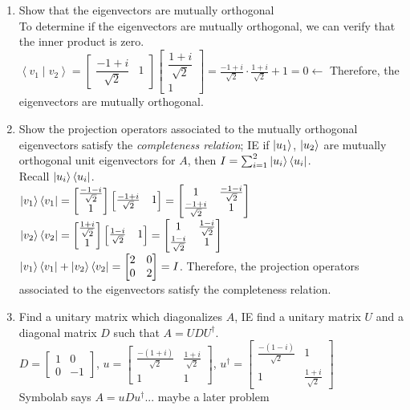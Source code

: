 \documentclass[12pt]{article}
\theoremstyle{plain}
\theoremstyle{nonumberplain}
\theoremstyle{plain}
\theoremstyle{nonumberplain}
\newcommand\1{{\bf 1}}
\newcommand{\bmat}[1]{\begin{bmatrix*} #1 \end{bmatrix*}} %
\newcommand{\<}{\left\langle}
\renewcommand{\>}{\right\rangle}
\newcommand{\inp}[2]{\left\langle#1\mid #2\right\rangle} %
\begin{document}
\begin{enumerate}[label=(\alph*)]
\item Show that the eigenvectors are mutually orthogonal \\
To determine if the eigenvectors are mutually orthogonal, we can verify that the inner product is zero. \\
$\inp{v_1}{v_2}=\bmat{\dfrac{-1+i}{\sqrt{2}} & 1}\bmat{\dfrac{1+i}{\sqrt{2}} \\ 1}=\frac{-1+i}{\sqrt{2}}\cdot\frac{1+i}{\sqrt{2}}+1=0\longleftarrow$ Therefore, the eigenvectors are mutually orthogonal.
\item Show the projection operators associated to the mutually orthogonal eigenvectors satisfy the \textit{completeness relation}; IE if $\ket{u_1}$, $\ket{u_2}$ are mutually orthogonal unit eigenvectors for $A$, then $I=\sum^2_{i=1}\ket{u_i}\bra{u_i}$. \\
Recall $\ket{u_i}\bra{u_i}$. \\
$\ket{v_1}\bra{v_1}=\bmat{\frac{-1-i}{\sqrt{2}} \\ 1}\bmat{\frac{-1+i}{\sqrt{2}} & 1}=\bmat{1 & \frac{-1-i}{\sqrt{2}} \\ \frac{-1+i}{\sqrt{2}} & 1}$ \\
$\ket{v_2}\bra{v_2}=\bmat{\frac{1+i}{\sqrt{2}} \\ 1}\bmat{\frac{1-i}{\sqrt{2}} & 1}=\bmat{1 & \frac{1-i}{\sqrt{2}} \\ \frac{1-i}{\sqrt{2}} & 1}$ \\
$\ket{v_1}\bra{v_1}+\ket{v_2}\bra{v_2}=\bmat{2 & 0 \\ 0 & 2}=I$. Therefore, the projection operators associated to the eigenvectors satisfy the completeness relation.
\item Find a unitary matrix which diagonalizes $A$, IE find a unitary matrix $U$ and a diagonal matrix $D$ such that $A=UDU^\dagger$. \\
$D=\bmat{1 & 0 \\ 0 & -1}$, $u=\bmat{\frac{-(1+i)}{\sqrt{2}} & \frac{1+i}{\sqrt{2}} \\ 1 & 1}$, $u^\dagger=\bmat{\frac{-(1-i)}{\sqrt{2}} & 1 \\ 1 & \frac{1+i}{\sqrt{2}}}$ \\
Symbolab says $A=uDu^\dagger$... maybe a later problem
\end{enumerate}

\end{document}
